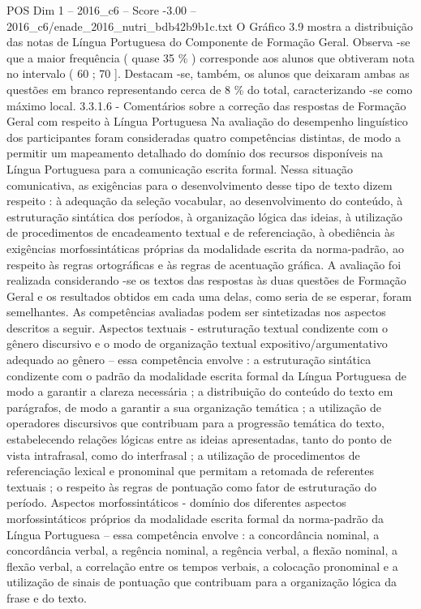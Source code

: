 \begin{textsample}{POS Dim 1 – 2016\_c6 – Score -3.00 – 2016\_c6/enade\_2016\_nutri\_bdb42b9b1c.txt}
O Gráfico 3.9 mostra a distribuição das notas de Língua Portuguesa do Componente de Formação Geral.
Observa -se que a maior frequência ( quase 35 \% ) corresponde aos alunos que obtiveram nota no intervalo ( 60 ; 70 ].
Destacam -se, também, os alunos que deixaram ambas as questões em branco representando cerca de 8 \% do total, caracterizando -se como máximo local. 3.3.1.6 - Comentários sobre a correção das respostas de Formação Geral com respeito à Língua Portuguesa Na avaliação do desempenho linguístico dos participantes foram consideradas quatro competências distintas, de modo a permitir um mapeamento detalhado do domínio dos recursos disponíveis na Língua Portuguesa para a comunicação escrita formal.
Nessa situação comunicativa, as exigências para o desenvolvimento desse tipo de texto dizem respeito : à adequação da seleção vocabular, ao desenvolvimento do conteúdo, à estruturação sintática dos períodos, à organização lógica das ideias, à utilização de procedimentos de encadeamento textual e de referenciação, à obediência às exigências morfossintáticas próprias da modalidade escrita da norma-padrão, ao respeito às regras ortográficas e às regras de acentuação gráfica.
A avaliação foi realizada considerando -se os textos das respostas às duas questões de Formação Geral e os resultados obtidos em cada uma delas, como seria de se esperar, foram semelhantes.
As competências avaliadas podem ser sintetizadas nos aspectos descritos a seguir.
Aspectos textuais - estruturação textual condizente com o gênero discursivo e o modo de organização textual expositivo/argumentativo adequado ao gênero – essa competência envolve : a estruturação sintática condizente com o padrão da modalidade escrita formal da Língua Portuguesa de modo a garantir a clareza necessária ; a distribuição do conteúdo do texto em parágrafos, de modo a garantir a sua organização temática ; a utilização de operadores discursivos que contribuam para a progressão temática do texto, estabelecendo relações lógicas entre as ideias apresentadas, tanto do ponto de vista intrafrasal, como do interfrasal ; a utilização de procedimentos de referenciação lexical e pronominal que permitam a retomada de referentes textuais ; o respeito às regras de pontuação como fator de estruturação do período.
Aspectos morfossintáticos - domínio dos diferentes aspectos morfossintáticos próprios da modalidade escrita formal da norma-padrão da Língua Portuguesa – essa competência envolve : a concordância nominal, a concordância verbal, a regência nominal, a regência verbal, a flexão nominal, a flexão verbal, a correlação entre os tempos verbais, a colocação pronominal e a utilização de sinais de pontuação que contribuam para a organização lógica da frase e do texto.

\end{textsample}
